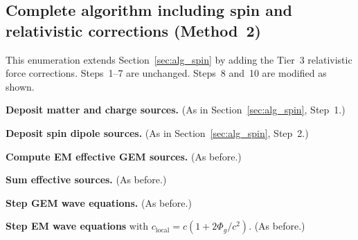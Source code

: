 \documentclass[11pt,a4paper]{article}
\newcommand{\Phig}{\Phi_g}
\begin{document}
\subsection{Complete algorithm including spin and relativistic corrections (Method~2)}
\label{sec:alg_rel}

This enumeration extends Section~\ref{sec:alg_spin} by adding the Tier~3 relativistic force corrections.  Steps~1--7 are unchanged.  Steps~8 and~10 are modified as shown.

\begin{algsteps}
  \item \textbf{Deposit matter and charge sources.} (As in Section~\ref{sec:alg_spin}, Step~1.)

  \item \textbf{Deposit spin dipole sources.} (As in Section~\ref{sec:alg_spin}, Step~2.)

  \item \textbf{Compute EM effective GEM sources.} (As before.)

  \item \textbf{Sum effective sources.} (As before.)

  \item \textbf{Step GEM wave equations.} (As before.)

  \item \textbf{Step EM wave equations} with $c_{\mathrm{local}} = c(1+2\Phig/c^2)$. (As before.)


\end{algsteps}
\end{document}
